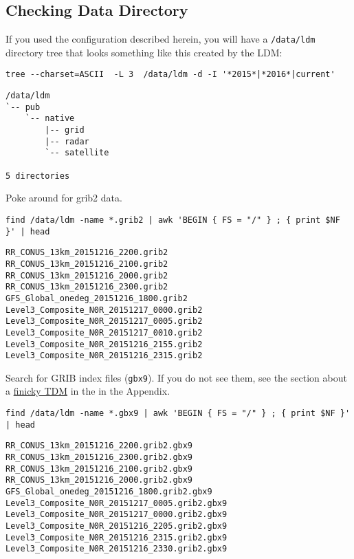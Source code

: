 \documentclass[11pt]{article}
\begin{document}
\subsection{Checking Data Directory}
\label{sec:orgheadline39}

If you used the configuration described herein, you will have a \texttt{/data/ldm} directory tree that looks something like this created by the LDM:

\begin{verbatim}
tree --charset=ASCII  -L 3  /data/ldm -d -I '*2015*|*2016*|current'
\end{verbatim}

\begin{verbatim}
/data/ldm
`-- pub
    `-- native
        |-- grid
        |-- radar
        `-- satellite

5 directories
\end{verbatim}

Poke around for grib2 data.

\begin{verbatim}
find /data/ldm -name *.grib2 | awk 'BEGIN { FS = "/" } ; { print $NF }' | head
\end{verbatim}

\begin{verbatim}
RR_CONUS_13km_20151216_2200.grib2
RR_CONUS_13km_20151216_2100.grib2
RR_CONUS_13km_20151216_2000.grib2
RR_CONUS_13km_20151216_2300.grib2
GFS_Global_onedeg_20151216_1800.grib2
Level3_Composite_N0R_20151217_0000.grib2
Level3_Composite_N0R_20151217_0005.grib2
Level3_Composite_N0R_20151217_0010.grib2
Level3_Composite_N0R_20151216_2155.grib2
Level3_Composite_N0R_20151216_2315.grib2
\end{verbatim}

Search for GRIB index files (\texttt{gbx9}). If you do not see them, see the section about a \hyperref[orgtarget6]{finicky TDM} in the in the Appendix.

\begin{verbatim}
find /data/ldm -name *.gbx9 | awk 'BEGIN { FS = "/" } ; { print $NF }' | head
\end{verbatim}

\begin{verbatim}
RR_CONUS_13km_20151216_2200.grib2.gbx9
RR_CONUS_13km_20151216_2300.grib2.gbx9
RR_CONUS_13km_20151216_2100.grib2.gbx9
RR_CONUS_13km_20151216_2000.grib2.gbx9
GFS_Global_onedeg_20151216_1800.grib2.gbx9
Level3_Composite_N0R_20151217_0005.grib2.gbx9
Level3_Composite_N0R_20151217_0000.grib2.gbx9
Level3_Composite_N0R_20151216_2205.grib2.gbx9
Level3_Composite_N0R_20151216_2315.grib2.gbx9
Level3_Composite_N0R_20151216_2330.grib2.gbx9
\end{verbatim}
\end{document}
